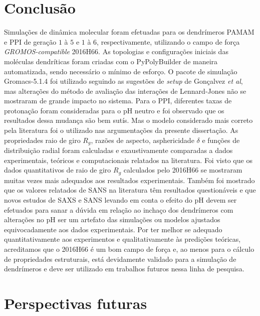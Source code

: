 \chapter{Conclusão}

Simulações de dinâmica molecular foram efetuadas para os dendrímeros PAMAM e PPI de geração $1$ à $5$ e $1$ à $6$, respectivamente, utilizando o campo de força \textit{GROMOS-compatible} 2016H66.
As topologias e configurações iniciais das moléculas dendríticas foram criadas com o PyPolyBuilder de maneira automatizada, sendo necessário o mínimo de esforço.
O pacote de simulação Gromacs-5.1.4 foi utilizado seguindo as sugestões de \textit{setup} de Gonçalvez \textit{et al}, mas alterações do método de avaliação das interações de Lennard-Jones não se mostraram de grande impacto no sistema.
Para o PPI, diferentes taxas de protonação foram consideradas para o pH neutro e foi observado que os resultados dessa mudança são bem sutís.
Mas o modelo considerado mais correto pela literatura foi o utilizado nas argumentações da presente dissertação.
As propriedades raio de giro $R_g$, razões de aspecto, asphericidade $\delta$ e funções de distribuição radial foram calculadas e exaustivamente comparadas a dados experimentais, teóricos e computacionais relatados na literatura.
Foi visto que os dados quantitativos de raio de giro $R_g$ calculados pelo 2016H66 se mostraram muitas vezes mais adequados aos resultados experimentais.
Também foi mostrado que os valores relatados de SANS na literatura têm resultados questionáveis e que novos estudos de SAXS e SANS levando em conta o efeito do pH devem ser efetuados para sanar a dúvida em relação ao inchaço dos dendrímeros com alterações no pH ser um artefato das simulações ou modelos ajustados equivocadamente aos dados experimentais.
Por ter melhor se adequado quantitativamente aos experimentos e qualitativamente às predições teóricas, acreditamos que o 2016H66 é um bom campo de força e, ao menos para o cálculo de propriedades estruturais, está devidamente validado para a simulação de dendrímeros e deve ser utilizado em trabalhos futuros nessa linha de pesquisa.

\chapter{Perspectivas futuras}

